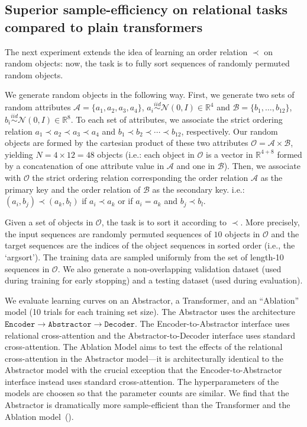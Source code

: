 \subsection{Superior sample-efficiency on relational tasks compared to plain transformers}
The next experiment extends the idea of learning an order relation $\prec$ on random objects: now, the task is to fully sort sequences of randomly permuted random objects.

We generate random objects in the following way. First, we generate two sets of random attributes $\mathcal{A} = \{a_1, a_2, a_3, a_4\}$, $a_i \overset{iid}{\sim} \mathcal{N}(0, I) \in \mathbb{R}^{4}$ and $\mathcal{B} = \{b_1, \ldots, b_{12}\}$, $b_i \overset{iid}{\sim} \mathcal{N}(0, I) \in \mathbb{R}^{8}$. To each set of attributes, we associate the strict ordering relation $a_1 \prec a_2 \prec a_3 \prec a_4$ and $b_1 \prec b_2 \prec \cdots \prec b_{12}$, respectively. Our random objects are formed by the cartesian product of these two attributes $\mathcal{O} = \mathcal{A} \times \mathcal{B}$, yielding $N = 4 \times 12 = 48$ objects (i.e.: each object in $\mathcal{O}$ is a vector in $\mathbb{R}^{4+8}$ formed by a concatenation of one attribute value in $\mathcal{A}$ and one in $\mathcal{B}$). Then, we associate with $\mathcal{O}$ the strict ordering relation corresponding the order relation $\mathcal{A}$ as the primary key and the order relation of $\mathcal{B}$ as the secondary key. i.e.: $(a_i, b_j) \prec (a_k, b_l)$ if $a_i \prec a_k$ or if $a_i = a_k$ and $b_j \prec b_l$.

Given a set of objects in $\mathcal{O}$, the task is to sort it according to $\prec$. More precisely, the input sequences are randomly permuted sequences of $10$ objects in $\mathcal{O}$ and the target sequences are the indices of the object sequences in sorted order (i.e., the `argsort'). The training data are sampled uniformly from the set of length-10 sequences in $\mathcal{O}$. We also generate a non-overlapping validation dataset (used during training for early stopping) and a testing dataset (used during evaluation).

We evaluate learning curves on an Abstractor, a Transformer, and an ``Ablation'' model (10 trials for each training set size). The Abstractor uses the architecture $\texttt{Encoder} \to \texttt{Abstractor} \to \texttt{Decoder}$. The Encoder-to-Abstractor interface uses relational cross-attention and the Abstractor-to-Decoder interface uses standard cross-attention. The Ablation Model aims to test the effects of the relational cross-attention in the Abstractor model---it is architecturally identical to the Abstractor model with the crucial exception that the Encoder-to-Abstractor interface instead uses standard cross-attention. The hyperparameters of the models are choosen so that the parameter counts are similar. %
We find that the Abstractor is dramatically more sample-efficient than the Transformer and the Ablation model~().

